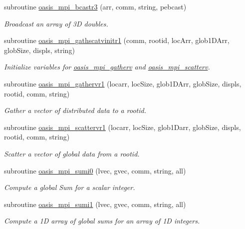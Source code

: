 \begin{DoxyCompactItemize}
subroutine \hyperlink{classmod__oasis__mpi_ac01edbda3e33b1feff9b797f83f82e8c}{oasis\+\_\+mpi\+\_\+bcastr3} (arr, comm, string, pebcast)
\begin{DoxyCompactList}\small\item\em Broadcast an array of 3\+D doubles. \end{DoxyCompactList}\item 
subroutine \hyperlink{classmod__oasis__mpi_a68afb4ab4136545faeaa2c37a1eb294a}{oasis\+\_\+mpi\+\_\+gathscatvinitr1} (comm, rootid, loc\+Arr, glob1\+D\+Arr, glob\+Size, displs, string)
\begin{DoxyCompactList}\small\item\em Initialize variables for \hyperlink{interfacemod__oasis__mpi_1_1oasis__mpi__gatherv}{oasis\+\_\+mpi\+\_\+gatherv} and \hyperlink{interfacemod__oasis__mpi_1_1oasis__mpi__scatterv}{oasis\+\_\+mpi\+\_\+scatterv}. \end{DoxyCompactList}\item 
subroutine \hyperlink{classmod__oasis__mpi_a88a13ea3b4f96074669fdc872fe41728}{oasis\+\_\+mpi\+\_\+gathervr1} (locarr, loc\+Size, glob1\+D\+Arr, glob\+Size, displs, rootid, comm, string)
\begin{DoxyCompactList}\small\item\em Gather a vector of distributed data to a rootid. \end{DoxyCompactList}\item 
subroutine \hyperlink{classmod__oasis__mpi_a9d0d807b92d39c9789eea4744d331612}{oasis\+\_\+mpi\+\_\+scattervr1} (locarr, loc\+Size, glob1\+Darr, glob\+Size, displs, rootid, comm, string)
\begin{DoxyCompactList}\small\item\em Scatter a vector of global data from a rootid. \end{DoxyCompactList}\item 
subroutine \hyperlink{classmod__oasis__mpi_adbb3963310e45ac012e5e28f13d5781e}{oasis\+\_\+mpi\+\_\+sumi0} (lvec, gvec, comm, string, all)
\begin{DoxyCompactList}\small\item\em Compute a global Sum for a scalar integer. \end{DoxyCompactList}\item 
subroutine \hyperlink{classmod__oasis__mpi_a507bb5e0ae088d68bb68c566e8965bef}{oasis\+\_\+mpi\+\_\+sumi1} (lvec, gvec, comm, string, all)
\begin{DoxyCompactList}\small\item\em Compute a 1\+D array of global sums for an array of 1\+D integers. \end{DoxyCompactList}\item 

\end{DoxyCompactItemize}
